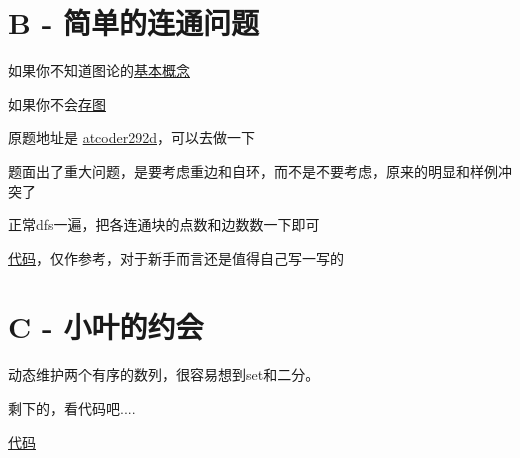 \documentclass{beamer}
\begin{document}
  \section{B - 简单的连通问题}

  \begin{frame}
    如果你不知道图论的\href{https://oi-wiki.org/graph/concept/}{基本概念}

    \vspace*{1\baselineskip}
    
    如果你不会\href{https://oi-wiki.org/graph/save/}{存图}

    \vspace*{1\baselineskip}
    
    原题地址是 \href{https://atcoder.jp/contests/abc292/tasks/abc292_d}{atcoder292d}，可以去做一下

    \vspace*{1\baselineskip}

    题面出了重大问题，是要考虑重边和自环，而不是不要考虑，原来的明显和样例冲突了
  \end{frame}

  \begin{frame}
    正常dfs一遍，把各连通块的点数和边数数一下即可

    \vspace*{1\baselineskip}

    \href{https://syh521.cn/file/at292d.cc}{代码}，仅作参考，对于新手而言还是值得自己写一写的
  \end{frame}

  \section{C - 小叶的约会}
  \begin{frame}
  
    动态维护两个有序的数列，很容易想到set和二分。

    剩下的，看代码吧....

    \vspace*{1\baselineskip}
    
    \href{https://syh521.cn/file/u297129.cc}{代码}
  \end{frame}
\end{document}
